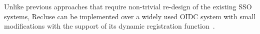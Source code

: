 Unlike previous approaches that require non-trivial re-design of the existing SSO systems, Recluse can be implemented over a widely used OIDC system with small modifications with the support of its dynamic registration function~\cite{DynamicRegistration}.





